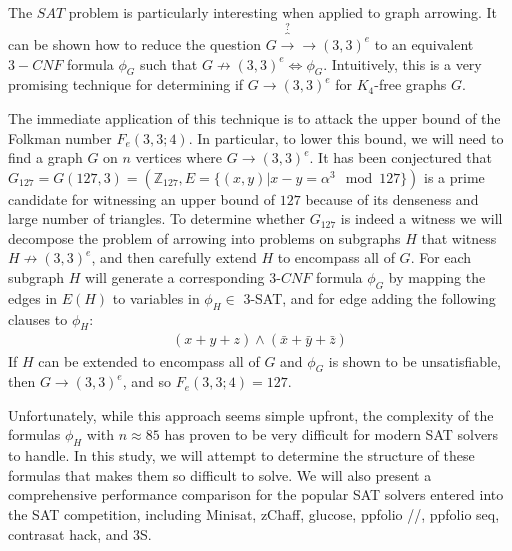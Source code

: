 \documentclass[paper=a4, fontsize=11pt]{scrartcl} %
\begin{document}
The $SAT$ problem is particularly interesting when applied to graph arrowing. It can be shown
how to reduce the question $G \overbrace{\to}^\text{?} \to (3,3)^e$ to an equivalent $3-CNF$ formula
$\phi_G$ such that $G \not \to (3,3)^e \Leftrightarrow \phi_G$. Intuitively, this is a very promising
technique for determining if $G \to (3,3)^e$ for $K_4$-free graphs $G$.

The immediate application of this technique is to attack the upper bound of the Folkman number
$F_e(3,3;4)$. In particular, to lower this bound, we will need to find a 
graph $G$ on $n$ vertices where $G \to (3,3)^e$. It has been conjectured that 
$G_{127} = G(127,3) = (\mathbb{Z}_{127}, E = \{(x,y) | x - y = \alpha^3 \mod 127\})$ is a
prime candidate for witnessing an upper bound of $127$ because of its denseness and large number
of triangles. To determine whether $G_{127}$ is indeed a witness we will decompose 
the problem of arrowing into problems on subgraphs $H$ that witness $H \not \to (3,3)^e$, 
and then carefully extend $H$ to encompass all of $G$. For each subgraph $H$ will generate
a corresponding $3$-$CNF$ formula $\phi_G$ by mapping the edges in $E(H)$ to variables 
in $\phi_H \in$ 3-SAT, and for edge adding the following clauses to $\phi_H$:
\begin{align*}
(x + y + z) \wedge (\bar{x} + \bar{y} + \bar{z})
\end{align*}
If $H$ can be extended to encompass all of $G$ and $\phi_G$ is 
shown to be unsatisfiable, then $G \to (3,3)^e$, and so $F_e(3,3;4) = 127$.

Unfortunately, while this approach seems simple upfront, the complexity of the formulas
$\phi_H$ with $n \approx 85$ has proven to be very difficult for modern SAT solvers
to handle. In this study, we will attempt to determine the structure of these formulas
that makes them so difficult to solve. We will also present a comprehensive performance 
comparison for the popular SAT solvers entered into the SAT competition, including
Minisat, zChaff, glucose, ppfolio //, ppfolio seq, contrasat hack, and 3S.
\end{document}
